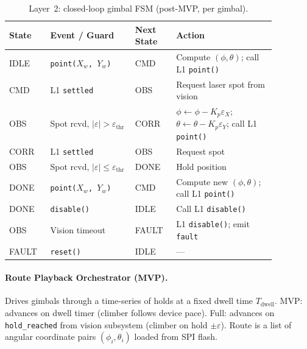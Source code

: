 \documentclass[12pt]{extarticle}
\begin{document}
\begin{table}[H]
\small\centering
\begin{tabular}{>{\raggedright}p{0.13\linewidth}
                >{\raggedright}p{0.28\linewidth}
                >{\raggedright}p{0.13\linewidth}
                >{\raggedright\arraybackslash}p{0.33\linewidth}}
\toprule
\textbf{State} & \textbf{Event / Guard} & \textbf{Next State} & \textbf{Action} \\
\midrule
IDLE  & \texttt{point($X_w$, $Y_w$)}                               & CMD   & Compute $(\phi,\theta)$; call L1 \texttt{point()} \\
CMD   & L1 \texttt{settled}                                         & OBS   & Request laser spot from vision \\
OBS   & Spot rcvd, $|\varepsilon| > \varepsilon_\text{thr}$         & CORR  & $\phi \leftarrow \phi - K_p\varepsilon_X$; $\theta \leftarrow \theta - K_p\varepsilon_Y$; call L1 \texttt{point()} \\
CORR  & L1 \texttt{settled}                                         & OBS   & Request spot \\
OBS   & Spot rcvd, $|\varepsilon| \leq \varepsilon_\text{thr}$      & DONE  & Hold position \\
DONE  & \texttt{point($X_w$, $Y_w$)}                               & CMD   & Compute new $(\phi,\theta)$; call L1 \texttt{point()} \\
DONE  & \texttt{disable()}                                          & IDLE  & Call L1 \texttt{disable()} \\
OBS   & Vision timeout                                              & FAULT & L1 \texttt{disable()}; emit \texttt{fault} \\
FAULT & \texttt{reset()}                                            & IDLE  & --- \\
\bottomrule
\end{tabular}
\caption{Layer~2: closed-loop gimbal FSM (post-MVP, per gimbal).}
\label{tab:fsm-cl-gimbal}
\end{table}

\paragraph{Route Playback Orchestrator (MVP).}
Drives gimbals through a time-series of holds at a fixed dwell time $T_\text{dwell}$.
MVP: advances on dwell timer (climber follows device pace).
Full: advances on \texttt{hold\_reached} from vision subsystem (climber on hold $\pm\varepsilon$).
Route is a list of angular coordinate pairs $(\phi_i, \theta_i)$ loaded from SPI flash.
\end{document}
